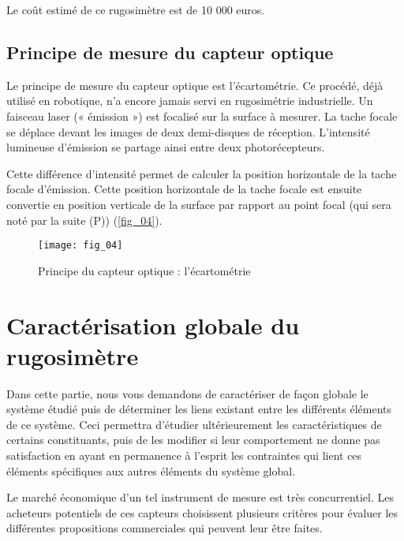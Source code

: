Le coût estimé de ce rugosimètre est de 10 000 euros.
\fi
\subsection{Principe de mesure du capteur optique}
\ifprof
\else
Le principe de mesure du capteur optique est l’écartométrie. Ce procédé, déjà utilisé en robotique, n’a encore jamais servi en rugosimétrie industrielle. Un faisceau laser (« émission ») est focalisé sur la surface à mesurer. La tache focale se déplace devant les images de deux demi-disques de réception. L’intensité lumineuse d’émission se partage ainsi entre deux photorécepteurs.

Cette différence d’intensité permet de calculer la position horizontale de la tache focale d’émission. Cette position horizontale de la tache focale est ensuite convertie en position verticale de la surface par rapport au point focal (qui sera noté par la suite (P)) (\autoref{fig_04}).

\begin{figure}[H]
\centering
\texttt{[image: fig\_04]}
\caption{\label{fig_04} Principe du capteur optique : l’écartométrie}
\end{figure}
\fi

\section{Caractérisation globale du rugosimètre}
\ifprof
\else
Dans cette partie, nous vous demandons de caractériser de façon globale le système étudié puis de
déterminer les liens existant entre les différents éléments de ce système. Ceci permettra d’étudier
ultérieurement les caractéristiques de certains constituants, puis de les modifier si leur comportement ne
donne pas satisfaction en ayant en permanence à l’esprit les contraintes qui lient ces éléments spécifiques
aux autres éléments du système global.

Le marché économique d’un tel instrument de mesure est très concurrentiel. Les acheteurs potentiels de ces
capteurs choisissent plusieurs critères pour évaluer les différentes propositions commerciales qui peuvent
leur être faites.

\fi

